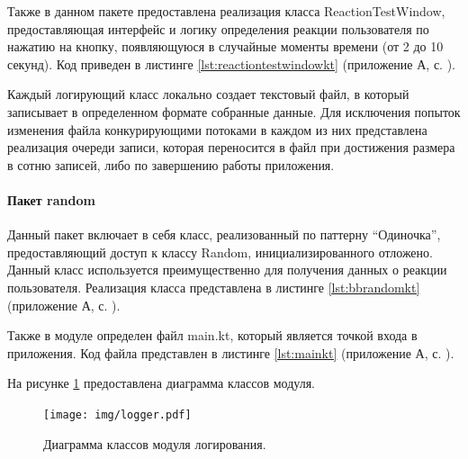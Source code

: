 Также в данном пакете предоставлена реализация класса ReactionTest\-Window, предоставляющая интерфейс и логику определения реакции пользователя по нажатию на кнопку, появляющуюся в случайные моменты времени (от 2 до 10 секунд). Код приведен в листинге \ref{lst:reactiontestwindowkt} (приложение А, с. \pageref{chp:application-a}).

Каждый логирующий класс локально создает текстовый файл, в который записывает в определенном формате собранные данные. Для исключения попыток изменения файла конкурирующими потоками в каждом из них представлена реализация очереди записи, которая переносится в файл при достижения размера в сотню записей, либо по завершению работы приложения.

\paragraph{Пакет random \newline}
Данный пакет включает в себя класс, реализованный по паттерну ``Одиночка'', предоставляющий доступ к классу Random, инициализированного отложено. Данный класс используется преимущественно для получения данных о реакции пользователя. Реализация класса представлена в листинге \ref{lst:bbrandomkt} (приложение А, с. \pageref{chp:application-a}).

Также в модуле определен файл main.kt, который является точкой входа в приложения. Код файла представлен в листинге \ref{lst:mainkt} (приложение А, с. \pageref{chp:application-a}).

На рисунке \ref{fig:loggingUml} предоставлена диаграмма классов модуля.
\begin{figure}[H]
	\centering
	\texttt{[image: img/logger.pdf]}
	\caption{Диаграмма классов модуля логирования.}
	\label{fig:loggingUml}
\end{figure}

